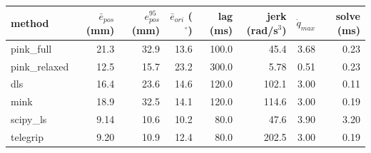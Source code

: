 \begin{tabular}{lrrrrrrr}
\toprule
method & $\bar{e}_{pos}$ (mm) & $e_{pos}^{95}$ (mm) & $\bar{e}_{ori}$ ($^\circ$) & lag (ms) & jerk (rad/s$^3$) & $\dot{q}_{max}$ & solve (ms) \\
\midrule
pink\_full & 21.3 & 32.9 & 13.6 & 100.0 & 45.4 & 3.68 & 0.23 \\
pink\_relaxed & 12.5 & 15.7 & 23.2 & 300.0 & 5.78 & 0.51 & 0.23 \\
dls & 16.4 & 23.6 & 14.6 & 120.0 & 102.1 & 3.00 & 0.11 \\
mink & 18.9 & 32.5 & 14.1 & 120.0 & 114.6 & 3.00 & 0.19 \\
scipy\_ls & 9.14 & 10.6 & 10.2 & 80.0 & 47.6 & 3.90 & 3.20 \\
telegrip & 9.20 & 10.9 & 12.4 & 80.0 & 202.5 & 3.00 & 0.19 \\
\bottomrule
\end{tabular}
